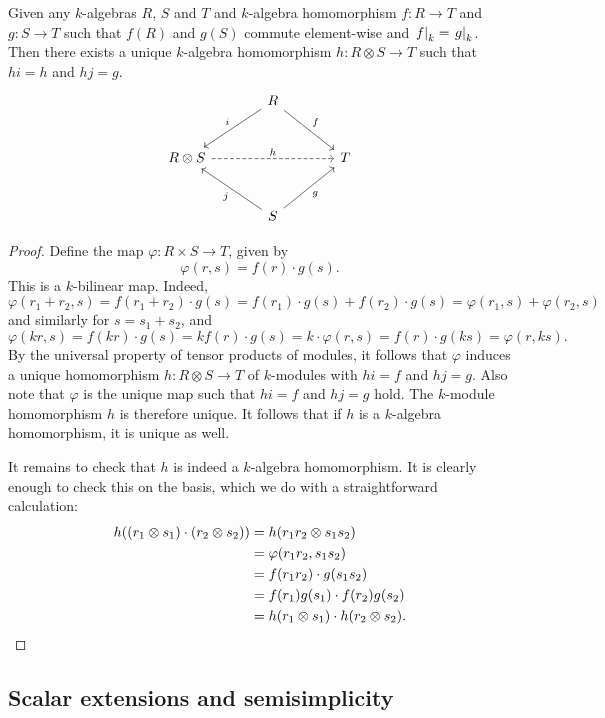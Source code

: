 \begin{trditev}
Given any $k$-algebras $R$, $S$ and $T$ and $k$-algebra
homomorphism $f \colon R \to T$ and $g \colon S \to T$ such that
$f(R)$ and $g(S)$ commute element-wise and
$\left. f\right|_{k}^{} = \left. g\right|_{k}^{}$. Then there exists a unique
$k$-algebra homomorphism $h \colon R \otimes S \to T$ such that
$hi = h$ and $hj = g$.
\[
\begin{tikzcd}[column sep=large, row sep=large]
& R \arrow[dl, "i"'] \arrow[dr, "f"] \\
R \otimes S \arrow[rr, dashed, "h"] && T \\
& S \arrow[ul, "j"] \arrow[ur, "g"']
\end{tikzcd}
\]
\end{trditev}

\begin{proof}
Define the map $\varphi \colon R \times S \to T$, given by
\[
\varphi(r, s) =  f(r) \cdot g(s).
\]
This is a $k$-bilinear map. Indeed,
\[
\varphi(r_1 + r_2, s) =
f(r_1 + r_2) \cdot g(s) =
f(r_1) \cdot g(s) + f(r_2) \cdot g(s) =
\varphi(r_1, s) + \varphi(r_2, s)
\]
and similarly for $s = s_1 + s_2$, and
\[
\varphi(kr, s) =
f(kr) \cdot g(s) =
k f(r) \cdot g(s) =
k \cdot \varphi(r, s) =
f(r) \cdot g(ks) =
\varphi(r, ks).
\]
By the universal property of tensor products of modules, it follows
that $\varphi$ induces a unique homomorphism
$h \colon R \otimes S \to T$ of $k$-modules with $hi = f$ and
$hj = g$. Also note that $\varphi$ is the unique map such that
$hi = f$ and $hj = g$ hold. The $k$-module homomorphism $h$ is
therefore unique. It follows that if $h$ is a $k$-algebra
homomorphism, it is unique as well.

It remains to check that $h$ is indeed a $k$-algebra homomorphism.
It is clearly enough to check this on the basis, which we do with a
straightforward calculation:
\begin{align*}
h((r_1 \otimes s_1) \cdot (r_2 \otimes s_2)) &=
h(r_1 r_2 \otimes s_1 s_2)
\\
&=
\varphi(r_1 r_2, s_1 s_2)
\\
&=
f(r_1 r_2) \cdot g(s_1 s_2)
\\
&=
f(r_1) g(s_1) \cdot f(r_2) g(s_2)
\\
&=
h(r_1 \otimes s_1) \cdot h(r_2 \otimes s_2). \qedhere
\end{align*}
\end{proof}

\newpage

\subsection{Scalar extensions and semisimplicity}

